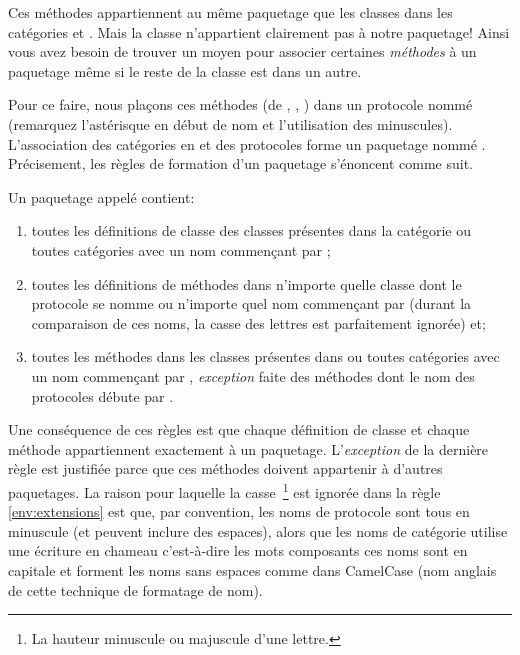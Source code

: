 \documentclass[a4paper,10pt,twoside]{book}
\begin{document}
\noindent
Ces m\'ethodes appartiennent au m\^eme paquetage que les classes
dans les cat\'egories  et .
Mais la classe  n'appartient clairement pas \`a notre paquetage!
Ainsi vous avez besoin de trouver un moyen pour associer certaines
\emph{m\'ethodes} \`a un paquetage m\^eme si le reste de la classe est dans
un autre. 

Pour ce faire, nous pla\c{c}ons ces m\'ethodes (de , ,  \etc) dans un protocole nomm\'e  (remarquez l'ast\'erisque en d\'ebut de nom et l'utilisation des minuscules). L'association des
cat\'egories en  et des protocoles  
forme un paquetage nomm\'e .
Pr\'ecisement, les r\`egles de formation d'un paquetage s'\'enoncent comme suit.

Un paquetage appel\'e  contient:

\begin{enumerate}		\label{sec:packageRules}
	\item{} toutes les d\'efinitions de classe des classes pr\'esentes dans
la cat\'egorie  ou toutes cat\'egories avec un nom commen\c{c}ant par
;
	\item{} \label{env:extensions} toutes les d\'efinitions de m\'ethodes
dans n'importe quelle classe dont le protocole se nomme  ou n'importe
quel nom commen\c{c}ant par  (durant la comparaison
de ces noms, la casse des lettres est parfaitement ignor\'ee) et;
	\item{} toutes les m\'ethodes dans les classes pr\'esentes dans
 ou toutes cat\'egories avec un nom commen\c{c}ant par , \emph{exception} faite des m\'ethodes dont le nom des protocoles d\'ebute par 
\prot{*}.
\end{enumerate}

\noindent
Une cons\'equence de ces r\`egles est que chaque d\'efinition de classe et chaque m\'ethode appartiennent exactement \`a un paquetage. 
L'\emph{exception} de la derni\`ere r\`egle est justifi\'ee parce que
ces m\'ethodes doivent appartenir \`a d'autres paquetages.
La raison pour laquelle la casse~\footnote{La hauteur minuscule ou majuscule d'une lettre.} est ignor\'ee dans la r\`egle 
\ref{env:extensions} 
est que, par convention, les noms de protocole sont tous en
minuscule (et peuvent inclure des espaces), alors que les 
noms de cat\'egorie utilise une \'ecriture en chameau c'est-\`a-dire les mots
composants ces noms sont en capitale et forment les noms sans espaces comme
dans CamelCase (nom anglais de cette technique de formatage de nom).
\end{document}
